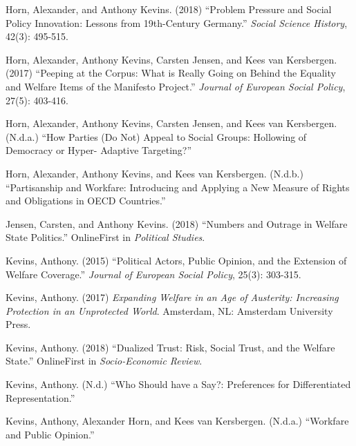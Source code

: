 \documentclass[letterpaper]{scrartcl}
\begin{document}
  \begin{hangparas}{.25in}{1}

    Horn, Alexander, and Anthony Kevins. (2018) ``Problem Pressure and Social Policy Innovation: Lessons from 19th-Century Germany.'' \textit{Social Science History}, 42(3): 495-515.
    \vspace{-.5em}

    Horn, Alexander, Anthony Kevins, Carsten Jensen, and Kees van Kersbergen. (2017) ``Peeping at the Corpus: What is Really Going on Behind the Equality and Welfare Items of the Manifesto Project.'' \textit{Journal of European Social Policy}, 27(5): 403-416.
    \vspace{-.5em}

    Horn, Alexander, Anthony Kevins, Carsten Jensen, and Kees van Kersbergen. (N.d.a.) ``How Parties (Do Not) Appeal to Social Groups: Hollowing of Democracy or Hyper- Adaptive Targeting?''
    \vspace{-.5em}

    Horn, Alexander, Anthony Kevins, and Kees van Kersbergen. (N.d.b.) ``Partisanship and Workfare: Introducing and Applying a New Measure of Rights and Obligations in OECD Countries.''
    \vspace{-.5em}

    Jensen, Carsten, and Anthony Kevins. (2018) ``Numbers and Outrage in Welfare State Politics.'' OnlineFirst in \textit{Political Studies}.
    \vspace{-.5em}

    Kevins, Anthony. (2015) ``Political Actors, Public Opinion, and the Extension of Welfare Coverage.'' \textit{Journal of European Social Policy}, 25(3): 303-315.
    \vspace{-.5em}

    Kevins, Anthony. (2017) \textit{Expanding Welfare in an Age of Austerity: Increasing Protection in an Unprotected World}. Amsterdam, NL: Amsterdam University Press.
    \vspace{-.5em}

    Kevins, Anthony. (2018) ``Dualized Trust: Risk, Social Trust, and the Welfare State.'' OnlineFirst in \textit{Socio-Economic Review}.
    \vspace{-.5em}

    Kevins, Anthony. (N.d.) ``Who Should have a Say?: Preferences for Differentiated Representation.''
    \vspace{-.5em}

    Kevins, Anthony, Alexander Horn, and Kees van Kersbergen. (N.d.a.) ``Workfare and Public Opinion.''
    \vspace{-.5em}


\end{hangparas}
\end{document}
